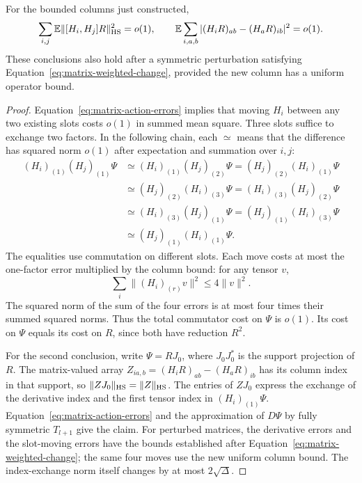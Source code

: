 \begin{lemma}\label{lem:matrix-index-exchange}
For the bounded columns just constructed,
\begin{equation}\label{eq:matrix-index-exchange}
 \sum_{i,j}\mathbb E\|[H_i,H_j]R\|_{\mathrm{HS}}^2=o(1),\qquad
 \mathbb E\sum_{i,a,b}|(H_iR)_{ab}-(H_aR)_{ib}|^2=o(1).
\end{equation}
These conclusions also hold after a symmetric perturbation satisfying
Equation~\eqref{eq:matrix-weighted-change}, provided the new column has a
uniform operator bound.
\end{lemma}
\begin{proof}
Equation~\eqref{eq:matrix-action-errors} implies that moving $H_i$ between
any two existing slots costs $o(1)$ in summed mean square.  Three slots
suffice to exchange two factors.  In the following chain, each $\simeq$
means that the difference has squared norm $o(1)$ after expectation and
summation over $i,j$:
\begin{align*}
 (H_i)_{(1)}(H_j)_{(1)}\Psi
 &\simeq (H_i)_{(1)}(H_j)_{(2)}\Psi
  = (H_j)_{(2)}(H_i)_{(1)}\Psi\\
 &\simeq (H_j)_{(2)}(H_i)_{(3)}\Psi
  = (H_i)_{(3)}(H_j)_{(2)}\Psi\\
 &\simeq (H_i)_{(3)}(H_j)_{(1)}\Psi
  = (H_j)_{(1)}(H_i)_{(3)}\Psi\\
 &\simeq (H_j)_{(1)}(H_i)_{(1)}\Psi.
\end{align*}
The equalities use commutation on different slots.  Each move costs at
most the one-factor error
multiplied by the column bound: for any tensor $v$,
\[
 \sum_i\|(H_i)_{(r)}v\|^2\le4\|v\|^2.
\]
The squared norm of the sum of the four errors is at most four times their
summed squared norms.  Thus the total commutator cost on $\Psi$ is $o(1)$.
Its cost on $\Psi$ equals its cost on $R$, since both have reduction $R^2$.

For the second conclusion, write $\Psi=RJ_0$, where $J_0J_0^*$ is the
support projection of $R$.  The matrix-valued array
$Z_{ia,b}=(H_iR)_{ab}-(H_aR)_{ib}$ has its column index in that support,
so $\|ZJ_0\|_{\mathrm{HS}}=\|Z\|_{\mathrm{HS}}$.  The entries of $ZJ_0$ express the
exchange of the derivative index and the first tensor index in
$(H_i)_{(1)}\Psi$.  Equation~\eqref{eq:matrix-action-errors} and the
approximation of $D\Psi$ by fully symmetric $T_{l+1}$ give the claim.
For perturbed matrices, the derivative errors and the slot-moving errors
have the bounds established after Equation~\eqref{eq:matrix-weighted-change};
the same four moves use the new uniform column bound.  The index-exchange
norm itself changes by at most $2\sqrt\Delta$.
\end{proof}

